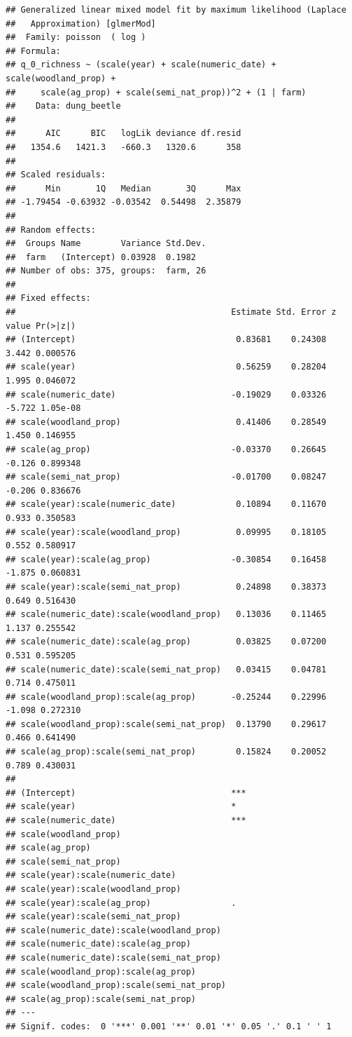 \documentclass[
]{article}
\begin{document}
\begin{verbatim}
## Generalized linear mixed model fit by maximum likelihood (Laplace
##   Approximation) [glmerMod]
##  Family: poisson  ( log )
## Formula: 
## q_0_richness ~ (scale(year) + scale(numeric_date) + scale(woodland_prop) +  
##     scale(ag_prop) + scale(semi_nat_prop))^2 + (1 | farm)
##    Data: dung_beetle
## 
##      AIC      BIC   logLik deviance df.resid 
##   1354.6   1421.3   -660.3   1320.6      358 
## 
## Scaled residuals: 
##      Min       1Q   Median       3Q      Max 
## -1.79454 -0.63932 -0.03542  0.54498  2.35879 
## 
## Random effects:
##  Groups Name        Variance Std.Dev.
##  farm   (Intercept) 0.03928  0.1982  
## Number of obs: 375, groups:  farm, 26
## 
## Fixed effects:
##                                           Estimate Std. Error z value Pr(>|z|)
## (Intercept)                                0.83681    0.24308   3.442 0.000576
## scale(year)                                0.56259    0.28204   1.995 0.046072
## scale(numeric_date)                       -0.19029    0.03326  -5.722 1.05e-08
## scale(woodland_prop)                       0.41406    0.28549   1.450 0.146955
## scale(ag_prop)                            -0.03370    0.26645  -0.126 0.899348
## scale(semi_nat_prop)                      -0.01700    0.08247  -0.206 0.836676
## scale(year):scale(numeric_date)            0.10894    0.11670   0.933 0.350583
## scale(year):scale(woodland_prop)           0.09995    0.18105   0.552 0.580917
## scale(year):scale(ag_prop)                -0.30854    0.16458  -1.875 0.060831
## scale(year):scale(semi_nat_prop)           0.24898    0.38373   0.649 0.516430
## scale(numeric_date):scale(woodland_prop)   0.13036    0.11465   1.137 0.255542
## scale(numeric_date):scale(ag_prop)         0.03825    0.07200   0.531 0.595205
## scale(numeric_date):scale(semi_nat_prop)   0.03415    0.04781   0.714 0.475011
## scale(woodland_prop):scale(ag_prop)       -0.25244    0.22996  -1.098 0.272310
## scale(woodland_prop):scale(semi_nat_prop)  0.13790    0.29617   0.466 0.641490
## scale(ag_prop):scale(semi_nat_prop)        0.15824    0.20052   0.789 0.430031
##                                              
## (Intercept)                               ***
## scale(year)                               *  
## scale(numeric_date)                       ***
## scale(woodland_prop)                         
## scale(ag_prop)                               
## scale(semi_nat_prop)                         
## scale(year):scale(numeric_date)              
## scale(year):scale(woodland_prop)             
## scale(year):scale(ag_prop)                .  
## scale(year):scale(semi_nat_prop)             
## scale(numeric_date):scale(woodland_prop)     
## scale(numeric_date):scale(ag_prop)           
## scale(numeric_date):scale(semi_nat_prop)     
## scale(woodland_prop):scale(ag_prop)          
## scale(woodland_prop):scale(semi_nat_prop)    
## scale(ag_prop):scale(semi_nat_prop)          
## ---
## Signif. codes:  0 '***' 0.001 '**' 0.01 '*' 0.05 '.' 0.1 ' ' 1
\end{verbatim}
\end{document}
